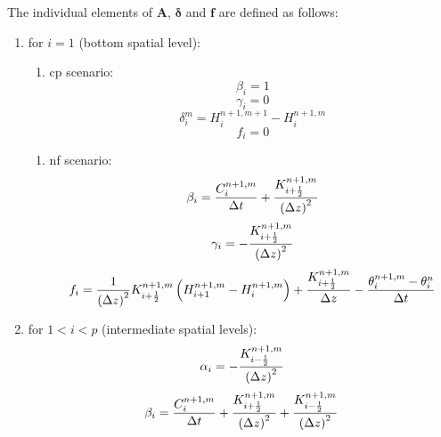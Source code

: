 The individual elements of $\mathbf A$, $\boldsymbol{\delta}$ and $\mathbf f$ are defined as follows:
\begin{enumerate}
\item for $i = 1$ (bottom spatial level):
  \begin{enumerate}
  \item cp scenario:
    \begin{equation}
    \label{eq:beta_bottom}
    \beta_i = 1
  \end{equation}
  \begin{equation}
    \label{eq:gamma_bottom}
    \gamma_i = 0
  \end{equation}
  \begin{equation}
    \label{eq:delta_bottom}
    \delta_i^m = H_i^{n+1,m+1} - H_i^{n+1,m}
  \end{equation}
  \begin{equation}
    \label{eq:f_bottom}
    f_i = 0
  \end{equation}
\end{enumerate}
  \begin{enumerate}
  \item nf scenario:
    \begin{equation}
      \label{eq:beta_bottom}
      \beta_i = \frac{C_i^{n+1,m}}{\Delta t} + \frac{K_{i+\frac{1}{2}}^{n+1,m}}{\del{ \Delta z }^2}
  \end{equation}
  \begin{equation}
    \label{eq:gamma_bottom}
    \gamma_i = - \frac{K_{i+\frac{1}{2}}^{n+1,m}}{\del{ \Delta z }^2}
  \end{equation}
  \begin{equation}
    \label{eq:f_bottom}
    f_i = \frac{1}{\del{ \Delta z }^2} K_{i+\frac{1}{2}}^{n+1,m} \del{ H_{i+1}^{n+1,m} - H_{i}^{n+1,m}} + \frac{K_{i+\frac{1}{2}}^{n+1,m}}{\Delta z} - \frac{\theta_i^{n+1,m} - \theta_i^{n}}{\Delta t}
  \end{equation}
\end{enumerate}
\item for $1 < i < p$ (intermediate spatial levels):
  \begin{equation}
    \label{eq:alpha_intermediate}
    \alpha_i = - \frac{K_{i-\frac{1}{2}}^{n+1,m}}{\del{ \Delta z }^2}
  \end{equation}
  \begin{equation}
    \label{eq:beta_intermediate}
    \beta_i = \frac{C_i^{n+1,m}}{\Delta t} + \frac{K_{i+\frac{1}{2}}^{n+1,m}}{\del{ \Delta z }^2} + \frac{K_{i-\frac{1}{2}}^{n+1,m}}{\del{ \Delta z }^2}

\end{equation}
\end{enumerate}
